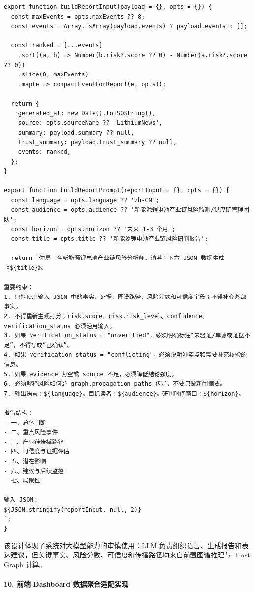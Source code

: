 ﻿\documentclass[12pt,a4paper]{article}
\begin{document}
\begin{lstlisting}[style=projectcode,caption={结构化证据约束下的 LLM 研判报告 Prompt 构造}]
export function buildReportInput(payload = {}, opts = {}) {
  const maxEvents = opts.maxEvents ?? 8;
  const events = Array.isArray(payload.events) ? payload.events : [];

  const ranked = [...events]
    .sort((a, b) => Number(b.risk?.score ?? 0) - Number(a.risk?.score ?? 0))
    .slice(0, maxEvents)
    .map(e => compactEventForReport(e, opts));

  return {
    generated_at: new Date().toISOString(),
    source: opts.sourceName ?? 'LithiumNews',
    summary: payload.summary ?? null,
    trust_summary: payload.trust_summary ?? null,
    events: ranked,
  };
}

export function buildReportPrompt(reportInput = {}, opts = {}) {
  const language = opts.language ?? 'zh-CN';
  const audience = opts.audience ?? '新能源锂电池产业链风险监测/供应链管理团队';
  const horizon = opts.horizon ?? '未来 1-3 个月';
  const title = opts.title ?? '新能源锂电池产业链风险研判报告';

  return `你是一名新能源锂电池产业链风险分析师。请基于下方 JSON 数据生成《${title}》。

重要约束：
1. 只能使用输入 JSON 中的事实、证据、图谱路径、风险分数和可信度字段；不得补充外部事实。
2. 不得重新主观打分；risk.score、risk.risk_level、confidence、verification_status 必须沿用输入。
3. 如果 verification_status = "unverified"，必须明确标注“未验证/单源或证据不足”，不得写成“已确认”。
4. 如果 verification_status = "conflicting"，必须说明冲突点和需要补充核验的信息。
5. 如果 evidence 为空或 source 不足，必须降低结论强度。
6. 必须解释风险如何沿 graph.propagation_paths 传导，不要只做新闻摘要。
7. 输出语言：${language}。目标读者：${audience}。研判时间窗口：${horizon}。

报告结构：
- 一、总体判断
- 二、重点风险事件
- 三、产业链传播路径
- 四、可信度与证据评估
- 五、潜在影响
- 六、建议与后续监控
- 七、局限性

输入 JSON：
${JSON.stringify(reportInput, null, 2)}
`;
}
\end{lstlisting}

该设计体现了系统对大模型能力的审慎使用：LLM 负责组织语言、生成报告和表达建议，但关键事实、风险分数、可信度和传播路径均来自前置图谱推理与 Trust Graph 计算。

\paragraph{10. 前端 Dashboard 数据聚合适配实现}
\end{document}
